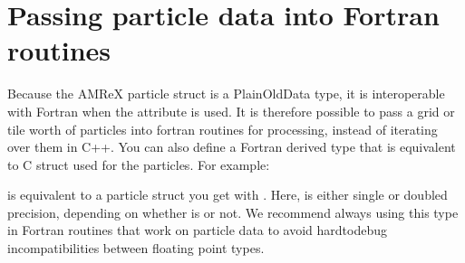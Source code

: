\documentclass[letterpaper,10pt,english]{sphinxmanual}
\begin{document}
\section{Passing particle data into Fortran routines}
\label{\detokenize{Particle:passing-particle-data-into-fortran-routines}}\label{\detokenize{Particle:sec-particles-fortran}}
\sphinxAtStartPar
Because the AMReX particle struct is a Plain\sphinxhyphen{}Old\sphinxhyphen{}Data type, it is interoperable
with Fortran when the  attribute is used. It is therefore
possible to pass a grid or tile worth of particles into fortran routines for
processing, instead of iterating over them in C++. You can also define a
Fortran derived type that is equivalent to C struct used for the particles. For
example:

\begin{sphinxVerbatim}[commandchars=\\\{\}]
  
      

    
     
     
     
       
       
\end{sphinxVerbatim}

\sphinxAtStartPar
is equivalent to a particle struct you get with . Here,
 is either single or doubled precision, depending
on whether  is  or not. We recommend
always using this type in Fortran routines that work on particle data to avoid
hard\sphinxhyphen{}to\sphinxhyphen{}debug incompatibilities between floating point types.
\end{document}
